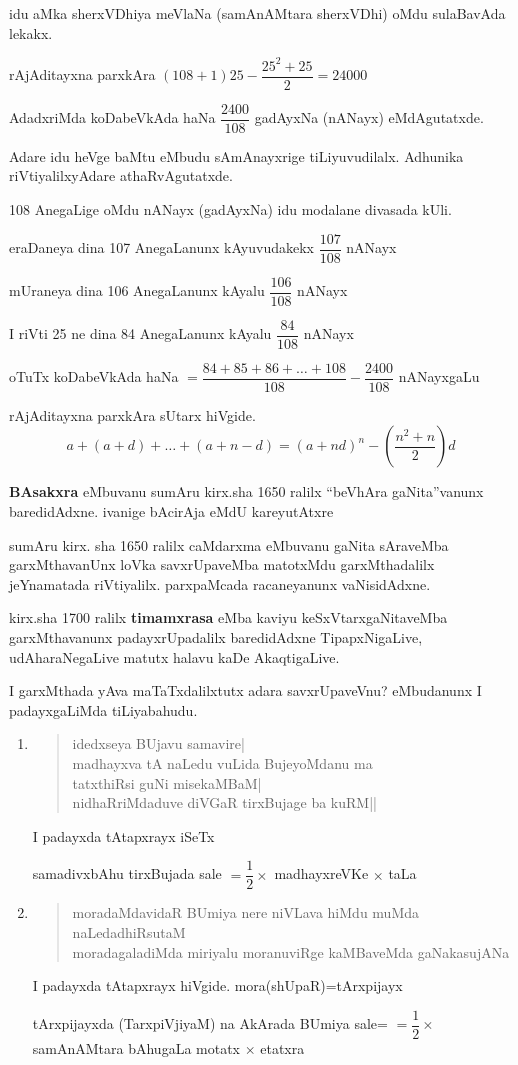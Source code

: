 idu aMka sherxVDhiya meVlaNa (samAnAMtara sherxVDhi) oMdu sulaBavAda lekakx.

rAjAditayxna parxkAra \quad $(108+1)25-\dfrac{25^2+25}{2}=24000$

AdadxriMda koDabeVkAda haNa \quad $\dfrac{2400}{108}$ \quad gadAyxNa (nANayx) eMdAgutatxde.

Adare idu heVge baMtu eMbudu sAmAnayxrige tiLiyuvudilalx. Adhunika riVtiyalilxyAdare athaRvAgutatxde.

{\rm 108} AnegaLige oMdu nANayx (gadAyxNa) idu modalane divasada kUli.

eraDaneya dina {\rm 107} AnegaLanunx kAyuvudakekx \quad $\dfrac{107}{108}$ \quad  nANayx

mUraneya dina {\rm 106} AnegaLanunx kAyalu \quad $\dfrac{106}{108}$ nANayx

I riVti {\rm 25} ne dina {\rm 84} AnegaLanunx kAyalu $\dfrac{84}{108}$ nANayx

oTuTx koDabeVkAda haNa \quad $=\dfrac{84+85+86+\ldots+108}{108}-\dfrac{2400}{108}$ \quad nANayxgaLu

rAjAditayxna parxkAra sUtarx hiVgide.
$$
a+(a+d)+\ldots+(a+n-d)
=(a+nd)^n-(\dfrac{n^2+n}{2})d
$$

\textbf{BAsakxra} eMbuvanu sumAru kirx.sha {\rm 1650} ralilx ``beVhAra gaNita''vanunx baredidAdxne. ivanige bAcirAja eMdU kareyutAtxre 

sumAru kirx. sha {\rm 1650} ralilx caMdarxma eMbuvanu gaNita sAraveMba garxMthavanUnx loVka savxrUpaveMba matotxMdu garxMthadalilx jeYnamatada riVtiyalilx. parxpaMcada racaneyanunx vaNisidAdxne.

kirx.sha {\rm1700} ralilx \textbf{timamxrasa} eMba kaviyu keSxVtarxgaNitaveMba garxMthavanunx padayxrUpadalilx baredidAdxne TipapxNigaLive, udAharaNegaLive matutx halavu kaDe AkaqtigaLive.

I garxMthada yAva maTaTxdalilxtutx adara savxrUpaveVnu? eMbudanunx I padayxgaLiMda tiLiyabahudu.
\begin{enumerate}[\rm 1)]
\item 
\begin{verse}
idedxseya BUjavu samavire|\\
madhayxva tA naLedu vuLida BujeyoMdanu ma\\
tatxthiRsi guNi misekaMBaM|\\
nidhaRriMdaduve diVGaR tirxBujage ba kuRM||
\end{verse}
I padayxda tAtapxrayx iSeTx 

samadivxbAhu tirxBujada sale \quad $=\dfrac{1}{2}\times$ \quad madhayxreVKe \quad $\times$ \quad taLa

\item 
\begin{verse}
moradaMdavidaR BUmiya nere niVLava hiMdu muMda naLedadhiR\-sutaM\\
moradagaladiMda miriyalu moranuviRge kaMBaveMda gaNakasujANa
\end{verse}

I padayxda tAtapxrayx hiVgide. mora(shUpaR)=tArxpijayx

tArxpijayxda (TarxpiVjiyaM) na AkArada BUmiya sale= $=\dfrac{1}{2}\times$ samAnAMtara bAhugaLa motatx $\times$ etatxra
\end{enumerate}

